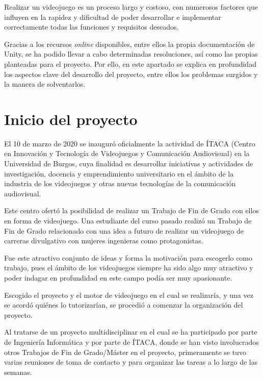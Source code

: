  \label{cap:aspectos}
Realizar un videojuego es un proceso largo y costoso, con numerosos factores que influyen en la rapidez y dificultad de poder desarrollar e implementar correctamente todas las funciones y requisitos deseados.

Gracias a los recursos \textit{online} disponibles, entre ellos la propia documentación de Unity, se ha podido llevar a cabo determinadas resoluciones, así como las propias planteadas para el proyecto. Por ello, en este apartado se explica en profundidad los aspectos clave del desarrollo del proyecto, entre ellos los problemas surgidos y la manera de solventarlos.

\section{Inicio del proyecto}

El 10 de marzo de 2020 se inauguró oficialmente la actividad de ÍTACA (Centro en Innovación y Tecnología de Videojuegos y Comunicación Audiovisual) en la Universidad de Burgos, cuya finalidad es desarrollar iniciativas y actividades de investigación, docencia y emprendimiento universitario en el ámbito de la industria de los videojuegos y otras nuevas tecnologías de la comunicación audiovisual.

Este centro ofertó la posibilidad de realizar un Trabajo de Fin de Grado con ellos en forma de videojuego. Una estudiante del curso pasado realizó un Trabajo de Fin de Grado relacionado con una idea a futuro de realizar un videojuego de carreras divulgativo con mujeres ingenieras como protagonistas. 

Fue este atractivo conjunto de ideas y forma la motivación para escogerlo como trabajo, pues el ámbito de los videojuegos siempre ha sido algo muy atractivo y poder indagar en profundidad en este campo podía ser muy apasionante.

Escogido el proyecto y el motor de videojuego en el cual se realizaría, y una vez se acordó quiénes lo tutorizarían, se procedió a comenzar la organización del proyecto.

Al tratarse de un proyecto multidisciplinar en el cual se ha participado por parte de Ingeniería Informática y por parte de ÍTACA, donde se han visto involucrados otros Trabajos de Fin de Grado/Máster en el proyecto, primeramente se tuvo varias reuniones de toma de contacto y para organizar las tareas a lo largo de las semanas.

